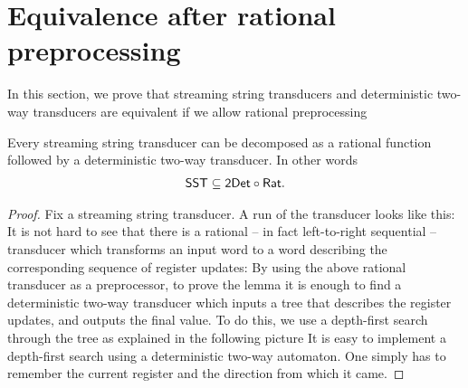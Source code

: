 \section{Equivalence after rational preprocessing}
\label{sec:sst-rational-equivalence}

In this section, we prove that streaming string transducers and  deterministic two-way transducers are equivalent if we allow   rational preprocessing

\begin{lemma}\label{lem:sst-to-two-way} Every streaming string transducer can be decomposed as a rational function followed by a deterministic two-way transducer. In other words
  \begin{align*}
\mathsf{SST} \subseteq \mathsf{2Det} \circ \mathsf{Rat}.	
\end{align*}
\end{lemma}
\begin{proof}
Fix a streaming string transducer. A run of the transducer looks like this: 
It is not hard to see that there is a rational -- in fact left-to-right sequential --  transducer which transforms an input word 
to a word describing the corresponding sequence of register updates: 
By using the above rational transducer as a preprocessor, to prove the lemma  it is enough to find a deterministic two-way transducer which inputs a tree that describes the register updates, and outputs the final value. To do this, we use a depth-first search through the tree as explained in the following picture 
It is easy to implement a depth-first search using a deterministic two-way automaton. One simply has to remember the current register and the direction from which it came.
\end{proof}



